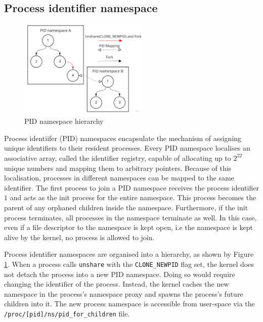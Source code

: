 \subsection{Process identifier namespace}
\label{sections:fundamentals/namespaces/process}
\begin{figure}[H]
    \centering
    \includegraphics[width=0.55\textwidth]{images/fundamentals/pid-namespace-hierarchy.jpg}
    \caption{PID namespace hierarchy}
    \label{images:fundamentals/pid-namespace-hierarchy.jpg}
\end{figure}
Process identiifer (PID) namespaces encapsulate the mechanism of assigning 
unique identifiers to their resident processes. Every PID namespace localises an associative 
array, called the identifier registry, capable of allocating up to $2^{22}$ unique numbers and mapping them to arbitrary 
pointers. Because of this localisation, processes in different namespaces can be mapped to the 
same identifier. The first process to join a PID namespace receives the process identifier $1$ 
and acts as the init process for the entire namespace. This process becomes the parent of 
any orphaned children inside the namespace. Furthermore, if the init process terminates, all processes 
in the namespace terminate as well. In this case, even if a file descriptor to the namespace is kept open, 
i.e the namespace is kept alive by the kernel, no process is allowed to join.  

Process identifier namespaces are organised into a hierarchy, 
as shown by Figure \ref{images:fundamentals/pid-namespace-hierarchy.jpg}.
When a process calls \verb|unshare| with the \verb|CLONE_NEWPID| flag set, 
the kernel does not detach the process into a new PID namespace. Doing so would require 
changing the identifier of the process.
Instead, the kernel caches the new namespace in the process's namespace proxy and 
spawns the process's future children into it. The new process namespace is accessible from 
user-space via the \verb|/proc/[pid]/ns/pid_for_children| file. 

